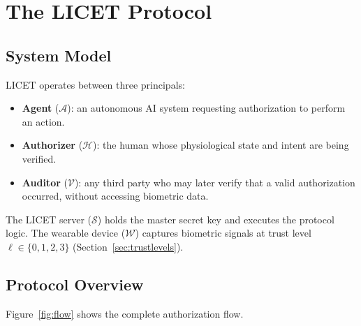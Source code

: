 \documentclass[12pt,a4paper]{article}
\begin{document}
\section{The LICET Protocol}

\subsection{System Model}

LICET operates between three principals:

\begin{itemize}
  \item \textbf{Agent} ($\mathcal{A}$): an autonomous AI system requesting
  authorization to perform an action.
  \item \textbf{Authorizer} ($\mathcal{H}$): the human whose physiological
  state and intent are being verified.
  \item \textbf{Auditor} ($\mathcal{V}$): any third party who may later verify
  that a valid authorization occurred, without accessing biometric data.
\end{itemize}

The LICET server ($\mathcal{S}$) holds the master secret key and executes the
protocol logic. The wearable device ($\mathcal{W}$) captures biometric signals
at trust level $\ell \in \{0, 1, 2, 3\}$ (Section~\ref{sec:trustlevels}).

\subsection{Protocol Overview}

Figure~\ref{fig:flow} shows the complete authorization flow.
\end{document}
